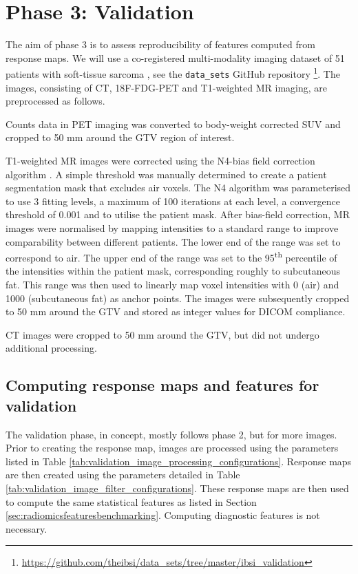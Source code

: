 \documentclass[fleqn,a4paper,oneside,openany]{book}
\renewcommand{\marginnote}[2][]{}
\begin{document}
\section{Phase 3: Validation}\label{sec:validationPhase}
\marginnote{\footnotesize v6: Introduced section on the validation phase. v7 updated configurations}
The aim of phase 3 is to assess reproducibility of features computed from response maps. We will use a co-registered multi-modality imaging dataset of 51 patients with soft-tissue sarcoma \cite{Vallieres2015-hv,Vallieres2015-tf}, see the \texttt{data\_sets} GitHub repository \footnote{\url{https://github.com/theibsi/data_sets/tree/master/ibsi_validation}}. The images, consisting of CT, 18F-FDG-PET and T1-weighted MR imaging, are preprocessed as follows.

Counts data in PET imaging was converted to body-weight corrected SUV and cropped to 50 mm around the GTV region of interest.

T1-weighted MR images were corrected using the N4-bias field correction algorithm \cite{Tustison2010-zb}. A simple threshold was manually determined to create a patient segmentation mask that excludes air voxels. The N4 algorithm was parameterised to use 3 fitting levels, a maximum of 100 iterations at each level, a convergence threshold of 0.001 and to utilise the patient mask. After bias-field correction, MR images were normalised by mapping intensities to a standard range to improve comparability between different patients. The lower end of the range was set to correspond to air. The upper end of the range was set to the 95\textsuperscript{th} percentile of the intensities within the patient mask, corresponding roughly to subcutaneous fat. This range was then used to linearly map voxel intensities with 0 (air) and 1000 (subcutaneous fat) as anchor points. The images were subsequently cropped to 50 mm around the GTV and stored as integer values for DICOM compliance.

CT images were cropped to 50 mm around the GTV, but did not undergo additional processing.

\subsection{Computing response maps and features for validation}

The validation phase, in concept, mostly follows phase 2, but for more images. Prior to creating the response map, images are processed using the parameters listed in Table \ref{tab:validation_image_processing_configurations}. Response maps are then created using the parameters detailed in Table \ref{tab:validation_image_filter_configurations}. These response maps are then used to compute the same statistical features as listed in Section \ref{sec:radiomicsfeaturesbenchmarking}. Computing diagnostic features is not necessary.
\end{document}
